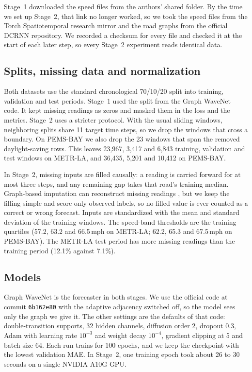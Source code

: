 \documentclass[journal]{IEEEtran}
\newcommand{\ms}{\,mph}
\begin{document}
Stage~1 downloaded the speed files from the authors' shared folder. By the time we set up Stage~2, that link no longer worked, so we took the speed files from the Torch Spatiotemporal research mirror \cite{cini2022tsl} and the road graphs from the official DCRNN repository. We recorded a checksum for every file and checked it at the start of each later step, so every Stage~2 experiment reads identical data.

\subsection{Splits, missing data and normalization}
Both datasets use the standard chronological 70/10/20 split into training, validation and test periods. Stage~1 used the split from the Graph WaveNet code. It kept missing readings as zeros and masked them in the loss and the metrics. Stage~2 uses a stricter protocol. With the usual sliding windows, neighboring splits share 11 target time steps, so we drop the windows that cross a boundary. On PEMS-BAY we also drop the 23 windows that span the removed daylight-saving rows. This leaves 23{,}967, 3{,}417 and 6{,}843 training, validation and test windows on METR-LA, and 36{,}435, 5{,}201 and 10{,}412 on PEMS-BAY.

In Stage~2, missing inputs are filled causally: a reading is carried forward for at most three steps, and any remaining gap takes that road's training median. Graph-based imputation can reconstruct missing readings \cite{cini2022grin}, but we keep the filling simple and score only observed labels, so no filled value is ever counted as a correct or wrong forecast. Inputs are standardized with the mean and standard deviation of the training windows. The speed-band thresholds are the training quartiles (57.2, 63.2 and 66.5\ms{} on METR-LA; 62.2, 65.3 and 67.5\ms{} on PEMS-BAY). The METR-LA test period has more missing readings than the training period (12.1\% against 7.1\%).

\subsection{Models}
Graph WaveNet \cite{wu2019graphwavenet} is the forecaster in both stages. We use the official code at commit \texttt{6b162e80} with the adaptive adjacency switched off, so the model sees only the graph we give it. The other settings are the defaults of that code: double-transition supports, 32 hidden channels, diffusion order 2, dropout 0.3, Adam with learning rate $10^{-3}$ and weight decay $10^{-4}$, gradient clipping at 5 and batch size 64. Each run trains for 100 epochs, and we keep the checkpoint with the lowest validation MAE. In Stage~2, one training epoch took about 26 to 30 seconds on a single NVIDIA A10G GPU.
\end{document}
